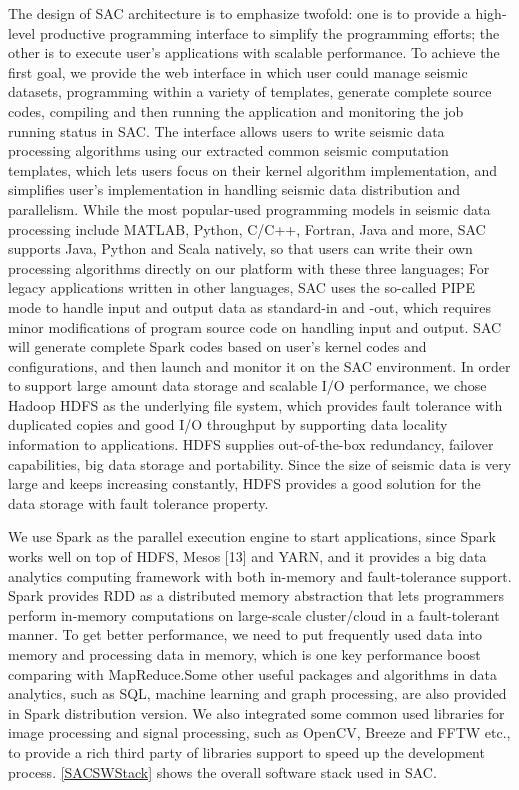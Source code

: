 The design of SAC architecture is to emphasize twofold: one is to provide a high-level productive programming interface to simplify the programming efforts; the other is to execute user's applications with scalable performance. To achieve the first goal, we provide the web interface in which user could manage seismic datasets, programming within a variety of templates, generate complete source codes, compiling and then running the application and monitoring the job running status in SAC. 
The interface allows users to write seismic data processing algorithms using our extracted common seismic computation templates, which lets users focus on their kernel algorithm implementation, and simplifies user's implementation in handling seismic data distribution and parallelism. 
While the most popular-used programming models in seismic data processing include MATLAB, Python, C/C++, Fortran, Java and more, SAC supports Java, Python and Scala natively, so that users can write their own processing algorithms directly on our platform with these three languages; For legacy applications written in other languages, SAC uses the so-called PIPE mode to handle input and output data as standard-in and -out, which requires minor modifications of program source code on handling input and output. 
SAC will generate complete Spark codes based on user's kernel codes and configurations, and then launch and monitor it on the SAC environment.
In order to support large amount data storage and scalable I/O performance, we chose Hadoop HDFS as the underlying file system, which provides fault tolerance with duplicated copies and good I/O throughput by supporting data locality information to applications. HDFS supplies out-of-the-box redundancy, failover capabilities, big data storage and portability. Since the size of seismic data is very large and keeps increasing constantly, HDFS provides a good solution for the data storage with fault tolerance property.

We use Spark as the parallel execution engine to start applications, since Spark works well on top of HDFS, Mesos [13] and YARN, and it provides a big data analytics computing framework with both in-memory and fault-tolerance support. Spark provides RDD as a distributed memory abstraction that lets programmers perform in-memory computations on large-scale cluster/cloud in a fault-tolerant manner. To get better performance, we need to put frequently used data into memory and processing data in memory, which is one key performance boost comparing with MapReduce.Some other useful packages and algorithms in data analytics, such as SQL, machine learning and graph processing, are also provided in Spark distribution version. We also integrated some common used libraries for image processing and signal processing, such as OpenCV, Breeze and FFTW etc., to provide a rich third party of libraries support to speed up the development process. \ref{SACSWStack} shows the overall software stack used in SAC.

